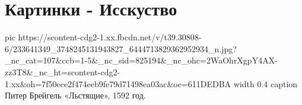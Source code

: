  
 
 
 
 
\section{Картинки - Исскуство}

\ifcmt
  pic https://scontent-cdg2-1.xx.fbcdn.net/v/t39.30808-6/233641349_3748245131943827_6444713829362952934_n.jpg?_nc_cat=107&ccb=1-5&_nc_sid=825194&_nc_ohc=2WaOhrXgpY4AX-zz3T8&_nc_ht=scontent-cdg2-1.xx&oh=7f50ece2f474eeb9fe79d71498ea03ac&oe=611DEDBA
  width 0.4
	caption Питер Брейгель «Льстящие», 1592 год.
\fi
